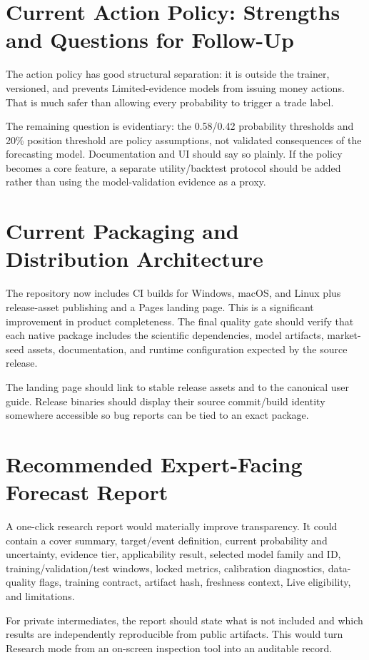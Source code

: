 \documentclass[11pt]{article}
\begin{document}
\section{Current Action Policy: Strengths and Questions for Follow-Up}
The action policy has good structural separation: it is outside the trainer, versioned, and prevents Limited-evidence models from issuing money actions. That is much safer than allowing every probability to trigger a trade label.

The remaining question is evidentiary: the 0.58/0.42 probability thresholds and 20\% position threshold are policy assumptions, not validated consequences of the forecasting model. Documentation and UI should say so plainly. If the policy becomes a core feature, a separate utility/backtest protocol should be added rather than using the model-validation evidence as a proxy.

\section{Current Packaging and Distribution Architecture}
The repository now includes CI builds for Windows, macOS, and Linux plus release-asset publishing and a Pages landing page. This is a significant improvement in product completeness. The final quality gate should verify that each native package includes the scientific dependencies, model artifacts, market-seed assets, documentation, and runtime configuration expected by the source release.

The landing page should link to stable release assets and to the canonical user guide. Release binaries should display their source commit/build identity somewhere accessible so bug reports can be tied to an exact package.

\section{Recommended Expert-Facing Forecast Report}
A one-click research report would materially improve transparency. It could contain a cover summary, target/event definition, current probability and uncertainty, evidence tier, applicability result, selected model family and ID, training/validation/test windows, locked metrics, calibration diagnostics, data-quality flags, training contract, artifact hash, freshness context, Live eligibility, and limitations.

For private intermediates, the report should state what is not included and which results are independently reproducible from public artifacts. This would turn Research mode from an on-screen inspection tool into an auditable record.
\end{document}
